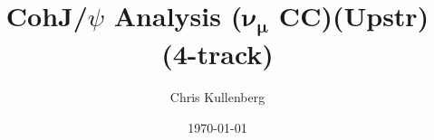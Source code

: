 \title{CohJ/$\psi$ Analysis ($\boldsymbol{\nu_\mu}$ \textbf{CC})(\textbf{Upstr})(\textbf{4-track})}
\author{Chris Kullenberg}
\date{\today}
